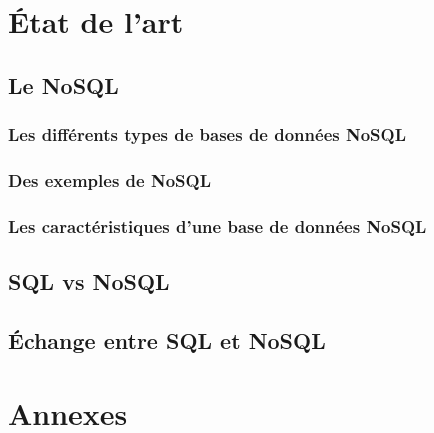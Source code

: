 



\tableofcontents
\listoffigures

\part{État de l'art}
      

                \chapter{Le \textsf{NoSQL}}
                

                        \section{Les différents types de bases de données \textsf{NoSQL}}\label{categorie} 
                         

                        \section{Des exemples de \textsf{NoSQL}}
                        

                        \section{Les caractéristiques d'une base de données \textsf{NoSQL}}\label{carac}
                        
                \newpage
                \chapter{\textsf{SQL} vs \textsf{NoSQL}}
                
                \newpage
                \chapter{Échange entre \textsf{SQL} et \textsf{NoSQL}}
                

\printindex




\part{Annexes}
\appendix



